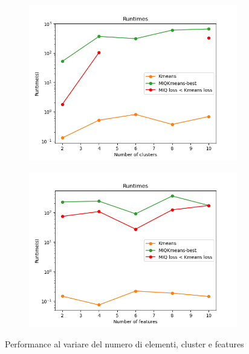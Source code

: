 \documentclass{article}
\begin{document}
\begin{figure}[h]
\begin{subfigure}{0.32\linewidth}
         \includegraphics[width=\linewidth]{../results/log_plots/runtime_centers_sint2_log}
     \end{subfigure}%
     \begin{subfigure}{0.32\linewidth}
         \includegraphics[width=\linewidth]{../results/log_plots/runtime_features_sint2_log}
     \end{subfigure}%
     \caption{Performance al variare del numero di elementi, cluster e features}
     \label{fig:runtime_loss_sint2}
    \end{figure}
\end{document}
